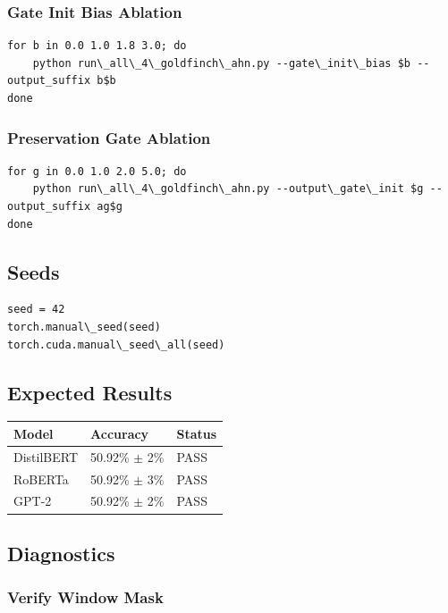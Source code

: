 \subsubsection{Gate Init Bias Ablation}

\begin{lstlisting}
for b in 0.0 1.0 1.8 3.0; do
    python run\_all\_4\_goldfinch\_ahn.py --gate\_init\_bias $b --output_suffix b$b
done
\end{lstlisting}

\subsubsection{Preservation Gate Ablation}

\begin{lstlisting}
for g in 0.0 1.0 2.0 5.0; do
    python run\_all\_4\_goldfinch\_ahn.py --output\_gate\_init $g --output_suffix ag$g
done
\end{lstlisting}

\subsection{Seeds}

\begin{lstlisting}
seed = 42
torch.manual\_seed(seed)
torch.cuda.manual\_seed\_all(seed)
\end{lstlisting}

\subsection{Expected Results}

\begin{table}[H]
\centering
\small
\begin{tabular}{lll}
\toprule
\textbf{Model} & \textbf{Accuracy} & \textbf{Status} \\
\midrule
DistilBERT & 50.92\% $\pm$ 2\% & PASS \\
RoBERTa & 50.92\% $\pm$ 3\% & PASS \\
GPT-2 & 50.92\% $\pm$ 2\% & PASS \\
\bottomrule
\end{tabular}
\end{table}

\subsection{Diagnostics}

\subsubsection{Verify Window Mask}


